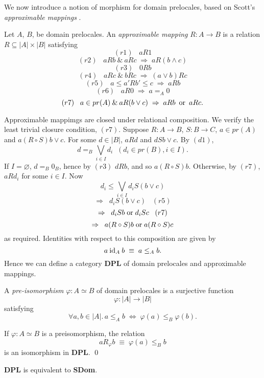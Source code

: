 We now introduce a notion of morphism for domain prelocales, based on Scott's {\it approximable mappings} \cite{Sco81,Sco82}.
\begin{definition} 
{\rm Let $A$, $B$, be domain prelocales. An {\it approximable mapping} $R : A \rightarrow B$ is a relation $R \subseteq |A| \times |B|$ satisfying}
\[ (r1) \;\;\; a R 1 \]
\[ (r2) \;\;\; a R b \: \& \: a R c \; \Rightarrow \; a R (b \wedge c) \]
\[ (r3) \;\;\; 0 R b\]
\[ (r4) \;\;\; a R c \: \& \: b R c \; \Rightarrow \; (a \vee b) R c \]
\[ (r5) \;\;\; a \leq a' R b' \leq c \; \Rightarrow \; a R b \]
\[ (r6) \;\;\; a R 0 \; \Rightarrow \; a =_{A} 0 \]
\[ (r7) \;\;\; a \in pr(A) \: \& \: a R (b \vee c) \; \Rightarrow \; a R b \: 
\; {\rm or} \; \: a R c. \]
\end{definition}

Approximable mappimgs are closed under relational composition. 
We verify the least trivial closure condition, $(r7)$. 
Suppose $R : A \rightarrow B$, $S : B \rightarrow C$, $a \in pr(A)$ and 
$a (R \circ S) b \vee c$. 
For some $d \in |B|$, $a R d$ and $d S b \vee c$. By $(d1)$,
\[ d =_{B} \bigvee_{i \in I}d_{i} \;\;(d_{i} \in pr(B), i \in I). \]
If $I = \varnothing$, $d =_{B} 0_{B}$, hence by $(r3)$ $d R b$, and so $a (R \circ S) b$. 
Otherwise, by $(r7)$, $a R d_{i}$ for some $i \in I$. Now
\[ d_{i} \leq \bigvee_{i \in I}d_{i} S (b \vee c) \]
\[ \Rightarrow \;\; d_{i} S (b \vee c) \;\;\; (r5) \]
\[ \Rightarrow \;\; d_{i} S b \; {\rm or} \; d_{i} S c \;\;\; (r7) \]
\[ \Rightarrow \;\; a (R \circ S) b \; {\rm or} \; a (R \circ S) c\]
as required.
Identities with respect to this composition are given by
\[ a \: {\rm id}_{A} \: b \; \equiv \; a \leq_{A} b. \]
Hence we can define a category {\bf DPL} of domain prelocales and approximable mappings.

\begin{definition} 
{\rm A {\em pre-isomorphism} $\varphi : A \simeq B$ of domain prelocales is a surjective function
\[ \varphi : |A| \rightarrow |B| \]
satisfying}
\[ \forall a, b \in |A|. \, a \leq_{A} b \; \Leftrightarrow \; \varphi (a) \leq_{B} \varphi (b). \]
\end{definition}
\begin{proposition}
If $\varphi : A \simeq B$ is a preisomorphism, the relation
\[ a R_{\varphi} b \; \equiv \; \varphi (a) \leq_{B} b \]
is an isomorphism in {\bf DPL}. \qed
\end{proposition}
\begin{theorem} \label{domtheq}
{\bf DPL} is equivalent to {\bf SDom}.
\end{theorem}

